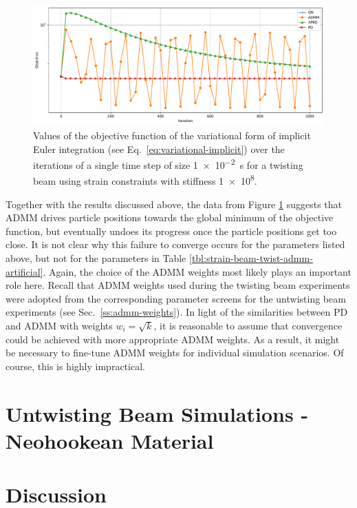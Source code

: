 \begin{figure}[h]
    \includegraphics[width=\textwidth]{figures/strain_beam_twist_objectives_admm_failure.pdf}
    \caption{Values of the objective function of the variational form of implicit Euler integration (see Eq.\ \ref{eq:variational-implicit}) over the iterations of 
        a single time step of size \SI{1e-2}{\second} for a twisting beam using strain constraints with stiffness \num{1e8}.}
    \label{fig:strain-beam-twist-objectives-admm-failure}
\end{figure}

Together with the results discussed above, the data from Figure \ref{fig:strain-beam-twist-objectives-admm-failure} suggests that ADMM drives particle 
positions towards the global minimum of the objective function, but eventually undoes its progress once the particle positions get too close. It is not clear why 
this failure to converge occurs for the parameters listed above, but not for the parameters in Table \ref{tbl:strain-beam-twist-admm-artificial}. Again, the choice 
of the ADMM weights most likely plays an important role here. Recall that ADMM weights used during the twisting beam experiments were adopted from the corresponding 
parameter screens for the untwisting beam experiments (see Sec.\ \ref{ss:admm-weights}). In light of the similarities between PD and ADMM with weights $w_i = \sqrt{k}$, 
it is reasonable to assume that convergence could be achieved with more appropriate ADMM weights. As a result, it might be necessary to fine-tune ADMM weights for 
individual simulation scenarios. Of course, this is highly impractical.

\section{Untwisting Beam Simulations - Neohookean Material}\label{ss:untwisting-beam-neohookean}

\section{Discussion}\label{s:discussion}

